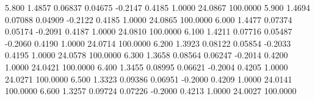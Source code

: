    5.800   1.4857   0.06837   0.04675  -0.2147   0.4185   1.0000  24.0867 100.0000
   5.900   1.4694   0.07088   0.04909  -0.2122   0.4185   1.0000  24.0865 100.0000
   6.000   1.4477   0.07374   0.05174  -0.2091   0.4187   1.0000  24.0810 100.0000
   6.100   1.4211   0.07716   0.05487  -0.2060   0.4190   1.0000  24.0714 100.0000
   6.200   1.3923   0.08122   0.05854  -0.2033   0.4195   1.0000  24.0578 100.0000
   6.300   1.3658   0.08564   0.06247  -0.2014   0.4200   1.0000  24.0421 100.0000
   6.400   1.3455   0.08995   0.06621  -0.2004   0.4205   1.0000  24.0271 100.0000
   6.500   1.3323   0.09386   0.06951  -0.2000   0.4209   1.0000  24.0141 100.0000
   6.600   1.3257   0.09724   0.07226  -0.2000   0.4213   1.0000  24.0027 100.0000
